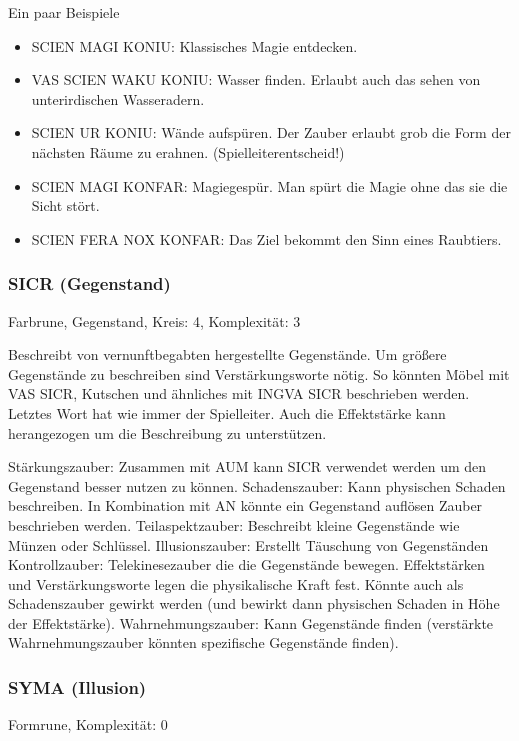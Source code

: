 \documentclass{article}
\begin{document}
Ein paar Beispiele

\begin{itemize}
\item SCIEN MAGI KONIU: Klassisches Magie entdecken.
\item VAS SCIEN WAKU KONIU: Wasser finden. Erlaubt auch das sehen von unterirdischen Wasseradern.
\item SCIEN UR KONIU: Wände aufspüren. Der Zauber erlaubt grob die Form der nächsten Räume zu erahnen. (Spielleiterentscheid!)
\item SCIEN MAGI KONFAR: Magiegespür. Man spürt die Magie ohne das sie die Sicht stört.
\item SCIEN FERA NOX KONFAR: Das Ziel bekommt den Sinn eines Raubtiers.
\end{itemize}

\subsubsection{SICR (Gegenstand)}

Farbrune, Gegenstand, Kreis: 4, Komplexität: 3

Beschreibt von vernunftbegabten hergestellte Gegenstände. Um größere Gegenstände zu beschreiben sind
Verstärkungsworte nötig. So könnten Möbel mit VAS SICR, Kutschen und ähnliches mit INGVA SICR beschrieben werden.
Letztes Wort hat wie immer der Spielleiter. Auch die Effektstärke kann herangezogen um die Beschreibung zu
unterstützen.

Stärkungszauber: Zusammen mit AUM kann SICR verwendet werden um den Gegenstand besser nutzen zu können.
Schadenszauber: Kann physischen Schaden beschreiben. In Kombination mit AN könnte ein Gegenstand auflösen Zauber
beschrieben werden.
Teilaspektzauber: Beschreibt kleine Gegenstände wie Münzen oder Schlüssel.
Illusionszauber: Erstellt Täuschung von Gegenständen
Kontrollzauber: Telekinesezauber die die Gegenstände bewegen. Effektstärken und Verstärkungsworte legen die
physikalische Kraft fest. Könnte auch als Schadenszauber gewirkt werden (und bewirkt dann physischen Schaden in Höhe
der Effektstärke).
Wahrnehmungszauber: Kann Gegenstände finden (verstärkte Wahrnehmungszauber könnten spezifische Gegenstände finden).

\subsubsection{SYMA (Illusion)}

Formrune, Komplexität: 0
\end{document}
